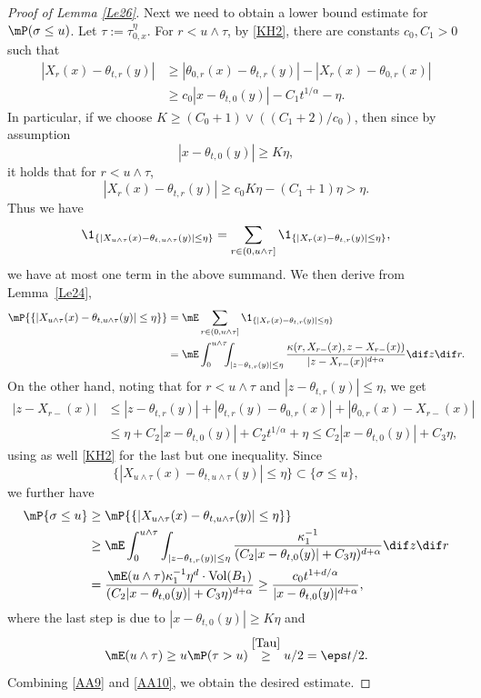 \begin{proof}[Proof of Lemma \ref{Le26}]
Next we need to obtain a lower bound estimate for $\mP(\sigma\leq u)$. Let $\tau:=\tau^\eta_{0,x}$.
For $r<u\wedge\tau$, by \eqref{KH2},
there are constants $c_0, C_1>0$ such that
\begin{align*}
|X_{r}(x)-\theta_{t,r}(y)|&\geq|\theta_{0,r}(x)-\theta_{t,r}(y)|-|X_{r}(x)-\theta_{0,r}(x)|
\\&\geq c_0|x-\theta_{t,0}(y)|-C_1 t^{1/\alpha}-\eta.
\end{align*}
In particular, if we choose $K\geq (C_0+1)\vee ((C_1+2)/c_0)$, then since by assumption
\[
|x-\theta_{t,0}(y)|\geq K\eta,
\]
it holds that for $r<u\wedge\tau$,
\begin{equation*}
|X_{r}(x)-\theta_{t,r}(y)|\geq c_0K\eta-(C_1+1)\eta>\eta.\label{DG2}
\end{equation*}
Thus we have
\[
\1_{\{|X_{u\wedge\tau}(x)-\theta_{t,u\wedge\tau}(y)|\leq\eta\}}
=\sum_{r\in(0,u\wedge\tau]}\1_{\{|X_r(x)-\theta_{t,r}(y)|\leq\eta\}},
\]
\ie we have at most one term in the above summand. We then derive from Lemma~\ref{Le24},
\begin{align*}
\mP{\{|X_{u\wedge\tau}(x)-\theta_{t,u\wedge\tau}(y)|\leq\eta\}}
&=\mE\sum_{r\in(0,u\wedge\tau]}\1_{\{|X_r(x)-\theta_{t,r}(y)|\leq\eta\}}\\
&=\mE\int^{u\wedge\tau}_0\!\!\!\int_{|z-\theta_{t,r}(y)|\leq\eta}\frac{\kappa(r, X_{r-}(x), z-X_{r-}(x))}{|z-X_{r-}(x)|^{d+\alpha}}\dif z\dif r.
\end{align*}
On the other hand, noting that for $r<u\wedge\tau$ and $|z-\theta_{t,r}(y)|\leq\eta$, we get
\begin{align*}
|z-X_{r-}(x)|&\leq|z-\theta_{t,r}(y)|+|\theta_{t,r}(y)-\theta_{0,r}(x)|+|\theta_{0,r}(x)-X_{r-}(x)|
\\&\leq \eta+C_2|x-\theta_{t,0}(y)|+C_2 t^{1/\alpha}+\eta\leq C_2|x-\theta_{t,0}(y)|+C_3\eta,
\end{align*}
using as well \eqref{KH2} for the last but one inequality. Since
\[
\{|X_{u\wedge\tau}(x)-\theta_{t,u\wedge\tau}(y)|\leq\eta\}\subset \{\sigma\leq u\},
\]
we further have
\begin{equation}
\begin{aligned}
\mP\{\sigma\leq u\}&\geq \mP{\{|X_{u\wedge\tau}(x)-\theta_{t,u\wedge\tau}(y)|\leq\eta\}}\\
&\geq\mE\int^{u\wedge\tau}_0\int_{|z-\theta_{t,r}(y)|\leq\eta}\frac{\kappa_1^{-1}}
{(C_2|x-\theta_{t,0}(y)|+C_3\eta)^{d+\alpha}}\dif z\dif r
\\&=\frac{\mE(u\wedge\tau)\kappa_1^{-1}\eta^d\cdot {\rm Vol}(B_1)}{(C_2|x-\theta_{t,0}(y)|+C_3\eta)^{d+\alpha}}
\geq\frac{c_0 t^{1+d/\alpha}}{|x-\theta_{t,0}(y)|^{d+\alpha}},\label{AA10}
\end{aligned}
\end{equation}
where the last step is due to $|x-\theta_{t,0}(y)|\geq K\eta$ and
\[
\mE (u\wedge\tau)\geq u\mP(\tau>u)\stackrel{\eqref{Tau}}{\geq} u/2=\eps t/2.
\]
Combining \eqref{AA9} and \eqref{AA10}, we obtain the desired estimate.
\end{proof}
